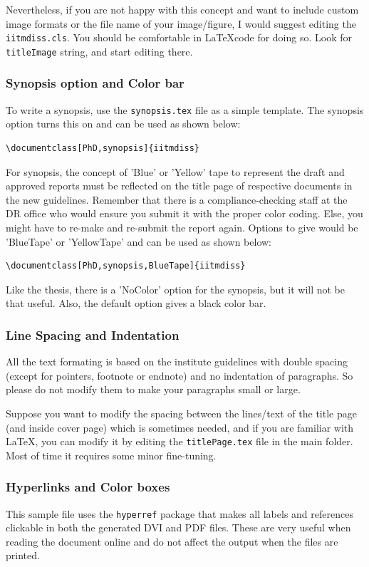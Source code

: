 Nevertheless, if you are not happy with this concept and want to include custom image formats or the file name of your image/figure, I would suggest editing the \verb+iitmdiss.cls+. You should be comfortable in \LaTeX code for doing so. Look for \verb+titleImage+ string, and start editing there.

\subsubsection{Synopsis option and Color bar}
To write a synopsis, use the \verb+synopsis.tex+ file as a simple template. The synopsis option turns this on and can be used as shown below:
\begin{verbatim}
\documentclass[PhD,synopsis]{iitmdiss}                                
\end{verbatim}

For synopsis, the concept of 'Blue' or 'Yellow' tape to represent the draft and approved reports must be reflected on the title page of respective documents in the new guidelines. Remember that there is a compliance-checking staff at the DR office who would ensure you submit it with the proper color coding. Else, you might have to re-make and re-submit the report again. Options to give would be 'BlueTape' or 'YellowTape' and can be used as shown below:
\begin{verbatim}
\documentclass[PhD,synopsis,BlueTape]{iitmdiss}                                
\end{verbatim}

Like the thesis, there is a 'NoColor' option for the synopsis, but it will not be that useful. Also, the default option gives a black color bar.

\subsubsection{Line Spacing and Indentation}
All the text formating is based on the institute guidelines with double spacing (except for pointers, footnote or endnote) and no indentation of paragraphs. So please do not modify them to make your paragraphs small or large. 

Suppose you want to modify the spacing between the lines/text of the title page (and inside cover page) which is sometimes needed, and if you are familiar with \LaTeX, you can modify it by editing the \verb+titlePage.tex+ file in the main folder. Most of time it requires some minor fine-tuning.

\subsubsection{Hyperlinks and Color boxes}
This sample file uses the \verb+hyperref+ package that makes all labels and references clickable in both the generated DVI and PDF files.  These are very useful when reading the document online and do not affect the output when the files are printed.

